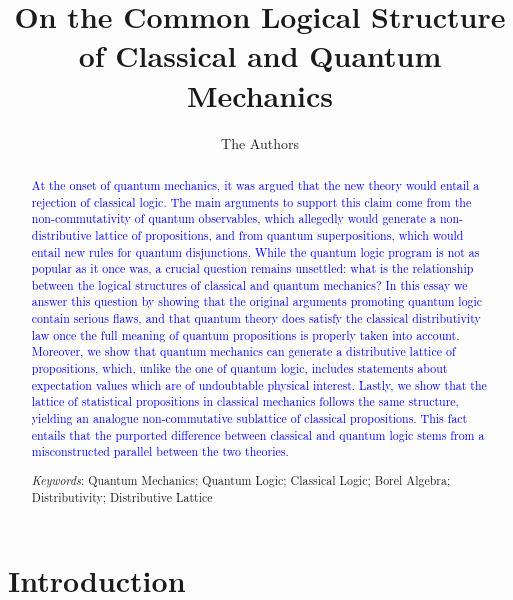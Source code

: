 \documentclass[11pt, executivepaper]{article}
\begin{document}
\title{\textbf{On the Common Logical Structure of Classical and Quantum Mechanics}}

\author{The Authors}


\maketitle

\begin{abstract}
\textcolor{blue}{At the onset of quantum mechanics, it was argued that the new theory would entail a rejection of classical logic. The main arguments to support this claim come from the non-commutativity of quantum observables, which allegedly would generate a non-distributive lattice of propositions, and from quantum superpositions, which would entail new rules for quantum disjunctions. While the quantum logic program is not as popular as it once was, a crucial question remains unsettled: what is the relationship between the logical structures of classical and quantum mechanics? In this essay we answer this question by showing that the original arguments promoting quantum logic contain serious flaws, and that quantum theory does satisfy the classical distributivity law once the full meaning of quantum propositions is properly taken into account. Moreover, we show that quantum mechanics can generate a distributive lattice of propositions, which, unlike the one of quantum logic, includes statements about expectation values which are of undoubtable physical interest. Lastly, we show that the lattice of statistical propositions in classical mechanics follows the same structure, yielding an analogue non-commutative sublattice of classical propositions. This fact entails that the purported difference between classical and quantum logic stems from a misconstructed parallel between the two theories.}
\vspace{4mm}

\noindent \emph{Keywords}: Quantum Mechanics; Quantum Logic; Classical Logic; Borel Algebra; Distributivity; Distributive Lattice
\end{abstract}
\vspace{5mm}
\clearpage

\tableofcontents
\vspace{5mm}

\section{Introduction}
\end{document}
